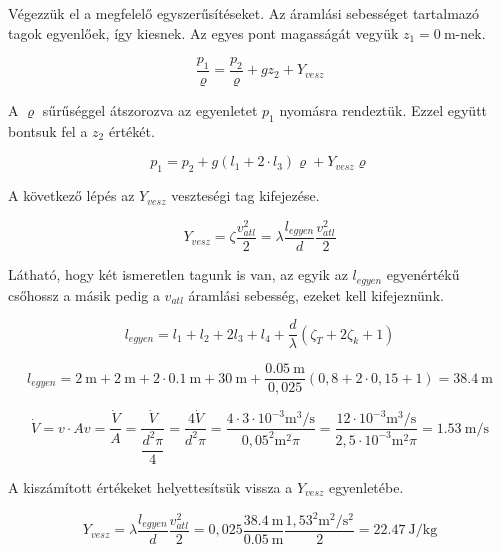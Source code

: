 \noindent Végezzük el a megfelelő egyszerűsítéseket. Az áramlási sebességet tartalmazó tagok egyenlőek, így kiesnek. Az egyes pont magasságát vegyük $z_{1} = \SI{0}{\m}$-nek. 

\begin{equation}
 \dfrac{p_{1}}{\varrho}
=
 \dfrac{p_{2}}{\varrho} +  gz_{2} + Y_{vesz}
\end{equation}

\noindent A $\varrho$ sűrűséggel átszorozva az egyenletet $p_{1}$ nyomásra rendeztük. Ezzel együtt bontsuk fel a $z_{2}$ értékét.

\begin{equation}
{p_{1}} = {p_{2}} + g (l_{1}+2 \cdot l_{3}) {\varrho} + Y_{vesz} {\varrho}
\end{equation}

\noindent A következő lépés az $Y_{vesz}$ veszteségi tag kifejezése.

\begin{equation}
Y_{vesz} = \zeta \dfrac {v_{atl}^2}{2} =\lambda \dfrac{l_{egyen}}{d} \dfrac {v_{atl}^2}{2}
\end{equation}

\noindent Látható, hogy két ismeretlen tagunk is van, az egyik az $l_{egyen}$ egyenértékű csőhossz a másik pedig a $v_{atl}$ áramlási sebesség, ezeket kell kifejeznünk.

\begin{equation}
l_{egyen} = l_{1}+l_{2}+2l_{3}+l_{4}+\dfrac{d}{\lambda}(\zeta_{T}+2\zeta_{k}+1)
\end{equation}

\begin{equation}
l_{egyen} = \SI{2}{\m}+\SI{2}{\m}+2 \cdot \SI{0,1}{\m}+\SI{30}{\m}+\dfrac{\SI{0,05}{\meter}}{0,025}(0,8+2\cdot 0,15 +1)=\SI{38,4}{\meter}
\end{equation}

\begin{equation}
\dot{V} = v \cdot A 
v=\dfrac{\dot{V}}{A} =\dfrac{\dot{V}}{\dfrac{d^2\pi}{4}} =
	\dfrac{4\dot{V}}{d^2\pi}=
	\dfrac{4\cdot 3 \cdot 10^{-3} \si{\meter\cubed\per\second}}{0,05^2\si{\m\squared}\pi}=
	\dfrac{12\cdot 10^{-3} \si{\meter\cubed\per\second}}{2,5\cdot 10^{-3}\si{\m\squared}\pi}=
	\SI{1,53}{\meter\per\second}
\end{equation}

\noindent A kiszámított értékeket helyettesítsük vissza a $Y_{vesz}$ egyenletébe.

\begin{equation}
Y_{vesz} =\lambda \dfrac{l_{egyen}}{d} \dfrac {v_{atl}^2}{2} =
 0,025 \dfrac{\SI{38,4}{\meter}}{\SI{0,05}{\meter}} \dfrac {1,53^2\si{\meter\squared\per\second\squared}}{2}=
 \SI {22,47}{\joule\per\kilogram}
\end{equation}

